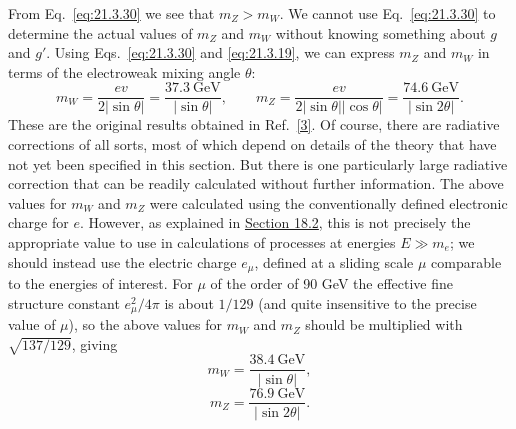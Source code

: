 From Eq.~\eqref{eq:21.3.30} we see that $m_Z>m_W$. We cannot use Eq.~\eqref{eq:21.3.30} to determine the actual values of $m_Z$ and $m_W$ without knowing something about $g$ and $g'$. Using Eqs.~\eqref{eq:21.3.30} and \eqref{eq:21.3.19}, we can express $m_Z$ and $m_W$ in terms of the electroweak mixing angle $\theta$:
\[
m_W=\frac{ev}{2\lvert\sin\theta\rvert}
=\frac{37.3\ \mathrm{GeV}}{\lvert\sin\theta\rvert},
\qquad
m_Z=\frac{ev}{2\lvert\sin\theta\rvert\lvert\cos\theta\rvert}
=\frac{74.6\ \mathrm{GeV}}{\lvert\sin2\theta\rvert}.
\]
These are the original results obtained in Ref.~\hyperref[ch21-ref-3]{[3]}. Of course, there are radiative corrections of all sorts, most of which depend on details of the theory that have not yet been specified in this section. But there is one particularly large radiative correction that can be readily calculated without further information. The above values for $m_W$ and $m_Z$ were calculated using the conventionally defined electronic charge for $e$. However, as explained in \hyperref[sec:18.2]{Section 18.2}, this is not precisely the appropriate value to use in calculations of processes at energies $E\gg m_e$; we should instead use the electric charge $e_\mu$, defined at a sliding scale $\mu$ comparable to the energies of interest. For $\mu$ of the order of 90 GeV the effective fine structure constant $e_\mu^2/4\pi$ is about $1/129$ (and quite insensitive to the precise value of $\mu$), so the above values for $m_W$ and $m_Z$ should be multiplied with $\sqrt{137/129}$, giving
\begin{equation}
m_W=\frac{38.4\ \mathrm{GeV}}{\lvert\sin\theta\rvert},
\tag{21.3.37}\label{eq:21.3.37}
\end{equation}
\begin{equation}
m_Z=\frac{76.9\ \mathrm{GeV}}{\lvert\sin2\theta\rvert}.
\tag{21.3.38}\label{eq:21.3.38}
\end{equation}


